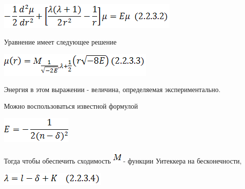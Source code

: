 \documentclass{article}
\begin{document}
\vspace{10pt}
\includegraphics[width=254pt, height=37pt, keepaspectratio=true]{3-fig031.png}

\vspace{28pt}
{\large{}Уравнение имеет следующее решение}

\vspace{10pt}
\includegraphics[width=218pt, height=34pt, keepaspectratio=true]{3-fig032.png}

\vspace{28pt}
{\large{}Энергия в этом выражении - величина, определяемая 
экспериментально.}

\vspace{10pt}
{\large{}Можно воспользоваться известной формулой 
}

\vspace{10pt}
\includegraphics[width=99pt, height=37pt, keepaspectratio=true]{3-fig033.png}

\vspace{28pt}
{\large{}Тогда чтобы обеспечить сходимость }
\includegraphics[width=12pt, height=19pt, keepaspectratio=true]{3-fig034.png}
{\large{} - функции Уитеккера на бесконечности, 
}

\vspace{10pt}
\includegraphics[width=149pt, height=19pt, keepaspectratio=true]{3-fig035.png}
\end{document}
